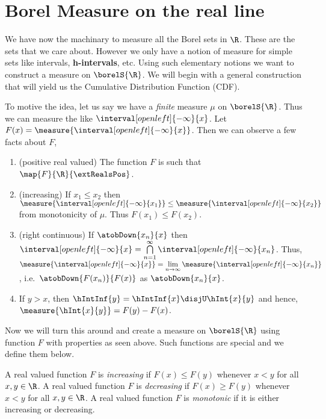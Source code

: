 \section{Borel Measure on the real line}
We have now the machinary to measure all the Borel sets in $\R$. These are the sets that we care
about. However we only have a notion of measure for simple sets like intervals,
\textbf{h-intervals}, etc. Using such elementary notions we want to construct a measure on
$\borelS{\R}$. We will begin with a general construction that will yield us the Cumulative
Distribution Function (CDF).

To motive the idea, let us say we have a \emph{finite} measure $\mu$ on $\borelS{\R}$. Thus we can measure the
 like $\interval[open left]{-\infty}{x}$. Let $F(x) = 
\measure{\interval[open left]{-\infty}{x}}$. Then we can observe a few facts about $F$,
\begin{enumerate}
    \item
	(positive real valued) The function $F$ is such that $\map{F}{\R}{\extRealsPos}$.
    \item
	(increasing) If $x_1 \leq x_2$ then $\measure{\interval[open left]{-\infty}{x_1}} \leq 
	\measure{\interval[open left]{-\infty}{x_2}}$ from monotonicity of $\mu$. Thus $F(x_1) \leq
	F(x_2)$.
    \item
	(right continuous) If $\atobDown{x_n}{x}$ then $\interval[open left]{-\infty}{x} =
	\bigcap\limits_{n=1}^{\infty}\interval[open left]{-\infty}{x_n}$. Thus, 
	$\measure{\interval[open left]{-\infty}{x}} = 
	\lim\limits_{n\to\infty}\measure{\interval[open left]{-\infty}{x_n}}$, i.e.\, 
	$\atobDown{F(x_n)}{F(x)}$ as $\atobDown{x_n}{x}$.
    \item
	If $y > x$, then $\hIntInf{y} = \hIntInf{x} \disjU \hInt{x}{y}$ and hence,
	$\measure{\hInt{x}{y}} = F(y) - F(x)$.
\end{enumerate}
Now we will turn this around and create a measure on $\borelS{\R}$ using function $F$ with 
properties as seen above. Such functions are special and we define them below.
\begin{Definition}[name=Monotonic functions]
    A real valued function $F$ is \emph{increasing} if $F(x) \leq F(y)$ whenever $x < y$ for all $x,y \in
    \R$. A real valued function $F$ is \emph{decreasing} if $F(x) \geq F(y)$ whenever $x < y $ for
    all $x,y \in \R$. A real valued function $F$ is \emph{monotonic} if it is either increasing or
    decreasing.
\end{Definition}
